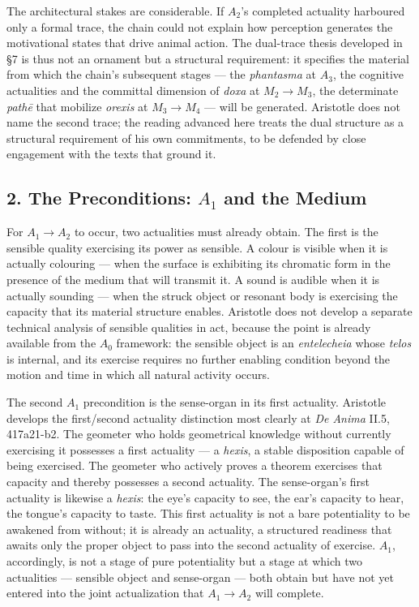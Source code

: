 \documentclass[12pt]{article}
\begin{document}
The architectural stakes are considerable. If $A_2$'s completed actuality harboured only a formal trace, the chain could not explain how perception generates the motivational states that drive animal action. The dual-trace thesis developed in §7 is thus not an ornament but a structural requirement: it specifies the material from which the chain's subsequent stages --- the \textit{phantasma} at $A_3$, the cognitive actualities and the committal dimension of \textit{doxa} at $M_2$$\to$$M_3$, the determinate \textit{pathē} that mobilize \textit{orexis} at $M_3$$\to$$M_4$ --- will be generated. Aristotle does not name the second trace; the reading advanced here treats the dual structure as a structural requirement of his own commitments, to be defended by close engagement with the texts that ground it.

\subsection*{2. The Preconditions: $A_1$ and the Medium}

For $A_1$$\to$$A_2$ to occur, two actualities must already obtain. The first is the sensible quality exercising its power as sensible. A colour is visible when it is actually colouring --- when the surface is exhibiting its chromatic form in the presence of the medium that will transmit it. A sound is audible when it is actually sounding --- when the struck object or resonant body is exercising the capacity that its material structure enables. Aristotle does not develop a separate technical analysis of sensible qualities in act, because the point is already available from the $A_0$ framework: the sensible object is an \textit{entelecheia} whose \textit{telos} is internal, and its exercise requires no further enabling condition beyond the motion and time in which all natural activity occurs.

The second $A_1$ precondition is the sense-organ in its first actuality. Aristotle develops the first/second actuality distinction most clearly at \textit{De Anima} II.5, 417a21-b2. The geometer who holds geometrical knowledge without currently exercising it possesses a first actuality --- a \textit{hexis}, a stable disposition capable of being exercised. The geometer who actively proves a theorem exercises that capacity and thereby possesses a second actuality. The sense-organ's first actuality is likewise a \textit{hexis}: the eye's capacity to see, the ear's capacity to hear, the tongue's capacity to taste. This first actuality is not a bare potentiality to be awakened from without; it is already an actuality, a structured readiness that awaits only the proper object to pass into the second actuality of exercise. $A_1$, accordingly, is not a stage of pure potentiality but a stage at which two actualities --- sensible object and sense-organ --- both obtain but have not yet entered into the joint actualization that $A_1$$\to$$A_2$ will complete.
\end{document}

